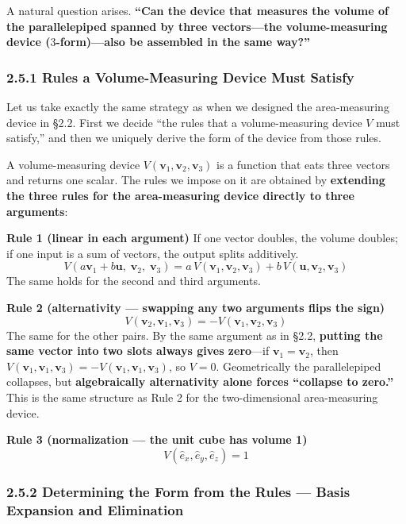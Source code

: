 A natural question arises. \textbf{``Can the device that measures the
volume of the parallelepiped spanned by three vectors---the
volume-measuring device (\(3\)-form)---also be assembled in the same
way?''}

\hypertarget{rules-a-volume-measuring-device-must-satisfy}{%
\subsubsection{2.5.1 Rules a Volume-Measuring Device Must
Satisfy}\label{rules-a-volume-measuring-device-must-satisfy}}

Let us take exactly the same strategy as when we designed the
area-measuring device in §2.2. First we decide ``the rules that a
volume-measuring device \(V\) must satisfy,'' and then we uniquely
derive the form of the device from those rules.

A volume-measuring device
\(V(\mathbf{v}_1, \mathbf{v}_2, \mathbf{v}_3)\) is a function that eats
three vectors and returns one scalar. The rules we impose on it are
obtained by
\textbf{extending the three rules for the area-measuring device directly to three arguments}:

\textbf{Rule 1 (linear in each argument)} If one vector doubles, the
volume doubles; if one input is a sum of vectors, the output splits
additively.
\[V(a\mathbf{v}_1 + b\mathbf{u},\; \mathbf{v}_2,\; \mathbf{v}_3) = a\,V(\mathbf{v}_1, \mathbf{v}_2, \mathbf{v}_3) + b\,V(\mathbf{u}, \mathbf{v}_2, \mathbf{v}_3)\]
The same holds for the second and third arguments.

\textbf{Rule 2 (alternativity — swapping any two arguments flips the sign)}
\[V(\mathbf{v}_2, \mathbf{v}_1, \mathbf{v}_3) = -V(\mathbf{v}_1, \mathbf{v}_2, \mathbf{v}_3)\]
The same for the other pairs. By the same argument as in §2.2,
\textbf{putting the same vector into two slots always gives zero}---if
\(\mathbf{v}_1 = \mathbf{v}_2\), then
\(V(\mathbf{v}_1,\mathbf{v}_1,\mathbf{v}_3) = -V(\mathbf{v}_1,\mathbf{v}_1,\mathbf{v}_3)\),
so \(V=0\). Geometrically the parallelepiped collapses, but
\textbf{algebraically alternativity alone forces “collapse to zero.”}
This is the same structure as Rule 2 for the two-dimensional
area-measuring device.

\textbf{Rule 3 (normalization — the unit cube has volume 1)}
\[V(\hat{e}_x, \hat{e}_y, \hat{e}_z) = 1\]

\hypertarget{determining-the-form-from-the-rules-basis-expansion-and-elimination}{%
\subsubsection{2.5.2 Determining the Form from the Rules --- Basis
Expansion and
Elimination}\label{determining-the-form-from-the-rules-basis-expansion-and-elimination}}

